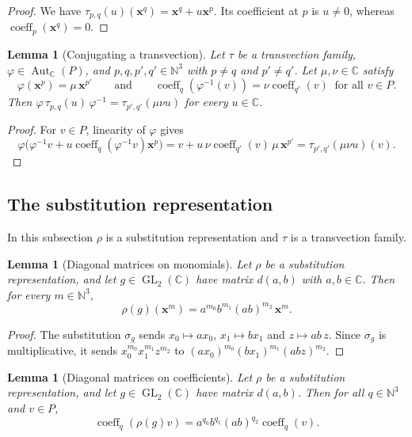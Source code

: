 \documentclass[11pt]{article}
\newtheorem{lemma}[theorem]{Lemma}
\theoremstyle{definition}
\theoremstyle{remark}
\newcommand{\CC}{\mathbb{C}}
\newcommand{\NN}{\mathbb{N}}
\DeclareMathOperator{\GL}{GL}
\DeclareMathOperator{\Aut}{Aut}
\DeclareMathOperator{\coeff}{coeff}
\begin{document}
\begin{proof}
We have $\tau_{p,q}(u)(\mathbf x^q)=\mathbf x^q+u\mathbf x^p$. Its coefficient at $p$ is $u\neq0$, whereas $\coeff_p(\mathbf x^q)=0$.
\end{proof}

\begin{lemma}[Conjugating a transvection]\label{lem:gm_conj_tau}
Let $\tau$ be a transvection family, $\varphi\in\Aut_\CC(P)$, and $p,q,p',q'\in\NN^3$ with $p\ne q$ and $p'\ne q'$. Let $\mu,\nu\in\CC$ satisfy
\[
\varphi(\mathbf x^p)=\mu\,\mathbf x^{p'}\qquad\text{and}\qquad \coeff_q(\varphi^{-1}(v))=\nu\coeff_{q'}(v)\ \text{ for all } v\in P .
\]
Then $\varphi\,\tau_{p,q}(u)\,\varphi^{-1}=\tau_{p',q'}(\mu\nu u)$ for every $u\in\CC$.
\end{lemma}

\begin{proof}
For $v\in P$, linearity of $\varphi$ gives
\[
\varphi\bigl(\varphi^{-1}v+u\coeff_q(\varphi^{-1}v)\mathbf x^p\bigr)=v+u\,\nu\coeff_{q'}(v)\,\mu\,\mathbf x^{p'}=\tau_{p',q'}(\mu\nu u)(v).
\]
\end{proof}

\subsection{The substitution representation}

In this subsection $\rho$ is a substitution representation and $\tau$ is a transvection family.

\begin{lemma}[Diagonal matrices on monomials]\label{lem:gm_rho_diag_monomial}
Let $\rho$ be a substitution representation, and let $g\in\GL_2(\CC)$ have matrix $d(a,b)$ with $a,b\in\CC$. Then for every $m\in\NN^3$,
\[
\rho(g)(\mathbf x^m)=a^{m_0}b^{m_1}(ab)^{m_2}\,\mathbf x^m .
\]
\end{lemma}

\begin{proof}
The substitution $\sigma_g$ sends $x_0\mapsto ax_0$, $x_1\mapsto bx_1$ and $z\mapsto ab\,z$. Since $\sigma_g$ is multiplicative, it sends $x_0^{m_0}x_1^{m_1}z^{m_2}$ to $(ax_0)^{m_0}(bx_1)^{m_1}(abz)^{m_2}$.
\end{proof}

\begin{lemma}[Diagonal matrices on coefficients]\label{lem:gm_coeff_rho_diag}
Let $\rho$ be a substitution representation, and let $g\in\GL_2(\CC)$ have matrix $d(a,b)$. Then for all $q\in\NN^3$ and $v\in P$,
\[
\coeff_q(\rho(g)v)=a^{q_0}b^{q_1}(ab)^{q_2}\coeff_q(v).
\]
\end{lemma}
\end{document}
